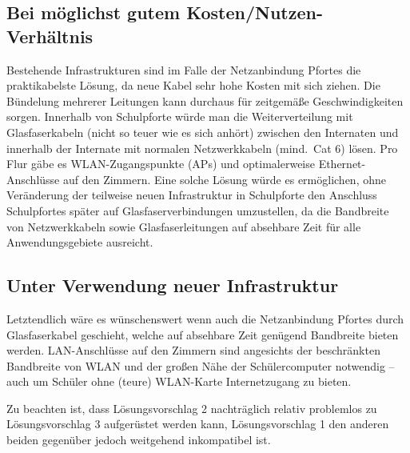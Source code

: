 \documentclass[10pt,a4paper,notitlepage]{scrartcl}
\begin{document}
\subsection{Bei möglichst gutem Kosten/Nutzen-Verhältnis}
\begin{multicols}{2}
Bestehende Infrastrukturen sind im Falle der Netzanbindung Pfortes die praktikabelste Lösung, da neue Kabel sehr hohe Kosten mit sich ziehen. Die Bündelung mehrerer Leitungen kann durchaus für zeitgemäße Geschwindigkeiten sorgen. Innerhalb von Schulpforte würde man die Weiterverteilung mit Glasfaserkabeln (nicht so teuer wie es sich anhört) zwischen den Internaten und innerhalb der Internate mit normalen Netzwerkkabeln (mind.\ Cat 6) lösen. Pro Flur gäbe es WLAN-Zugangspunkte (APs) und optimalerweise Ethernet-Anschlüsse auf den Zimmern. Eine solche Lösung würde es ermöglichen, ohne Veränderung der teilweise neuen Infrastruktur in Schulpforte den Anschluss Schulpfortes später auf Glasfaserverbindungen umzustellen, da die Bandbreite von Netzwerkkabeln sowie Glasfaserleitungen auf absehbare Zeit für alle Anwendungsgebiete ausreicht.
\end{multicols}
\subsection{Unter Verwendung neuer Infrastruktur}
\begin{multicols}{2}
Letztendlich wäre es wünschenswert wenn auch die Netzanbindung Pfortes durch Glasfaserkabel geschieht, welche auf absehbare Zeit genügend Bandbreite bieten werden. LAN-Anschlüsse auf den Zimmern sind angesichts der beschränkten Bandbreite von WLAN und der großen Nähe der Schülercomputer notwendig -- auch um Schüler ohne (teure) WLAN-Karte Internetzugang zu bieten.

Zu beachten ist, dass Lösungsvorschlag 2 nachträglich relativ problemlos zu Lösungsvorschlag 3 aufgerüstet werden kann, Lösungsvorschlag 1 den anderen beiden gegenüber jedoch weitgehend inkompatibel ist.
\end{multicols}
\end{document}
